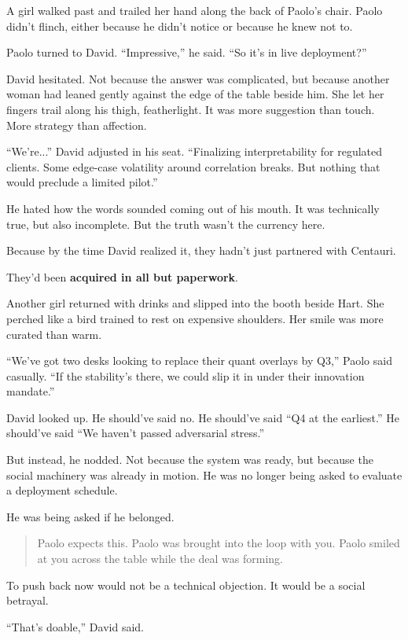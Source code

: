 A girl walked past and trailed her hand along the back of Paolo’s chair. Paolo didn’t flinch, either because he didn’t 
notice or because he knew not to.

Paolo turned to David. “Impressive,” he said. “So it’s in live deployment?”

David hesitated. Not because the answer was complicated, but because another woman had leaned gently against the edge 
of the table beside him. She let her fingers trail along his thigh, featherlight. It was more suggestion than touch. 
More strategy than affection.

“We’re...” David adjusted in his seat. “Finalizing interpretability for regulated clients. Some edge-case volatility 
around correlation breaks. But nothing that would preclude a limited pilot.”

He hated how the words sounded coming out of his mouth. It was technically true, but also incomplete. But the truth 
wasn’t the currency here.

Because by the time David realized it, they hadn’t just partnered with Centauri.

They’d been \textbf{acquired in all but paperwork}.

Another girl returned with drinks and slipped into the booth beside Hart. She perched like a bird trained to rest on 
expensive shoulders. Her smile was more curated than warm.

“We’ve got two desks looking to replace their quant overlays by Q3,” Paolo said casually. “If the stability’s there, 
we could slip it in under their innovation mandate.”

David looked up. He should’ve said no. He should’ve said “Q4 at the earliest.” He should’ve said “We haven’t passed 
adversarial stress.”

But instead, he nodded. Not because the system was ready, but because the social machinery was already in motion. 
He was no longer being asked to evaluate a deployment schedule.

He was being asked if he belonged.

\begin{quote}
Paolo expects this. Paolo was brought into the loop with you. Paolo smiled at you across the table while the 
deal was forming.
\end{quote}

To push back now would not be a technical objection. It would be a social betrayal.

“That’s doable,” David said.


